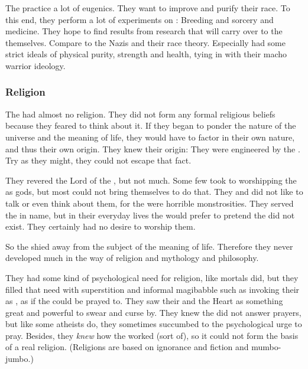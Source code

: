 The \resphain practice a lot of eugenics.
They want to improve and purify their race. 
To this end, they perform a lot of experiments on \humans:
Breeding and sorcery and medicine. 
They hope to find results from \human research that will carry over to the \resphain themselves. 
Compare to the Nazis and their race theory. 
Especially \Mystraacht had some strict ideals of physical purity, strength and health, tying in with their macho warrior ideology.





\subsubsection{Religion}
The \resphain had almost no religion.
They did not form any formal religious beliefs because they feared to think about it.
If they began to ponder the nature of the universe and the meaning of life, they would have to factor in their own nature, and thus their own origin.
They knew their origin: They were engineered by the \banes.
Try as they might, they could not escape that fact.

They revered the Lord of the \SitraAchra, but not much.
Some few took to worshipping the \SitraAchras as gods, but most could not bring themselves to do that.
They  and did not like to talk or even think about them, for the \banes were horrible monstrosities.
They served the \banelords in name, but in their everyday lives the \resphain would prefer to pretend the \banelords did not exist.
They certainly had no desire to worship them.

So the \resphain shied away from the subject of the meaning of life.
Therefore they never developed much in the way of religion and mythology and philosophy.

They had some kind of psychological need for religion, like mortals did, but they filled that need with superstition and informal magibabble such as invoking their \matrices as , as if the \matrices could be prayed to.
They saw their \matrices and the Heart as something great and powerful to swear and curse by. 
They knew the \matrices did not answer prayers, but like some atheists do, they sometimes succumbed to the psychological urge to pray.
Besides, they \emph{knew} how the \matrices worked (sort of), so it could not form the basis of a real religion. 
(Religions are based on ignorance and fiction and mumbo-jumbo.)







